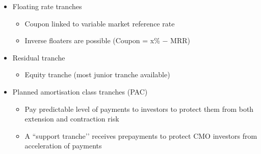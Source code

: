 \documentclass[../notes_compiled.tex]{subfiles}
\begin{document}
\begin{itemize}
\begin{itemize}
\begin{itemize}
\end{itemize}
\item Floating rate tranches
\begin{itemize}
\item Coupon linked to variable market reference rate
\item Inverse floaters are possible (Coupon = x\% $-$ MRR)
\end{itemize}
\item Residual tranche
\begin{itemize}
\item Equity tranche (most junior tranche available)
\end{itemize}
\item Planned amortisation class tranches (PAC)
\begin{itemize}
\item Pay predictable level of payments to investors to protect them from both extension and contraction risk
\item A ``support tranche’’ receives prepayments to protect CMO investors from acceleration of payments
\end{itemize}
\end{itemize}
\end{itemize}
\end{document}
